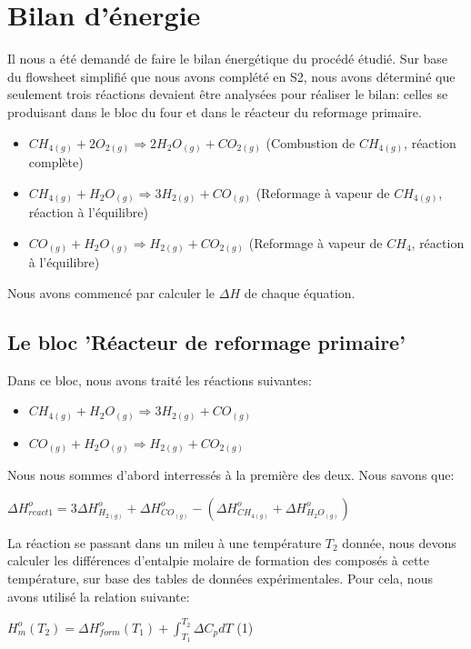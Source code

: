 \documentclass[11pt,a4paper]{report}
\author{Groupe 1246}
\begin{document}
\section*{Bilan d'énergie}
Il nous a été demandé de faire le bilan énergétique du procédé étudié. 
Sur base du flowsheet simplifié que nous avons complété en S2, nous avons déterminé que seulement trois réactions 
devaient être analysées pour réaliser le bilan: celles se produisant dans le bloc du four et dans le réacteur du 
reformage primaire.
\begin{itemize}
\item{$CH_{4(g)} + 2O_{2(g)} \Rightarrow 2H_{2}O_{(g)} + CO_{2(g)}$ (Combustion de $CH_{4(g)}$, réaction complète)}
\item{$CH_{4(g)} + H_{2}O_{(g)} \Rightarrow 3H_{2(g)} + CO_{(g)}$ (Reformage à vapeur de $CH_{4(g)}$, réaction à l'équilibre)}
\item{$CO_{(g)} + H_{2}O_{(g)} \Rightarrow H_{2(g)} + CO_{2(g)}$ (Reformage à vapeur de $CH_{4}$, réaction à l'équilibre)}
\end{itemize}

Nous avons commencé par calculer le $\Delta H$ de chaque équation.

\subsection*{Le bloc 'Réacteur de reformage primaire'}

Dans ce bloc, nous avons traité les réactions suivantes:
\begin{itemize}
\item{$CH_{4(g)} + H_{2}O_{(g)} \Rightarrow 3H_{2(g)} + CO_{(g)}$}
\item{$CO_{(g)} + H_{2}O_{(g)} \Rightarrow H_{2(g)} + CO_{2(g)}$}
\end{itemize}

Nous nous sommes d'abord interressés à la première des deux.
Nous savons que:

$\Delta H^o_{react1}=3\Delta H^o_{H_{2(g)}} + \Delta H^o_{CO_{(g)}} - (\Delta H^o_{CH_{4(g)}} + \Delta H^o_{H_{2}O_{(g)}})$

La réaction se passant dans un mileu à une température $T_2$ donnée, nous devons calculer les différences d'entalpie
molaire de formation des composés à cette température, sur base des tables de données expérimentales. Pour cela, nous 
avons utilisé la relation suivante:

$H^o_m(T_2)=\Delta H^o_{form}(T_1)+\int_{T_1}^{T_2} \Delta C_pdT$   (1)
\end{document}
